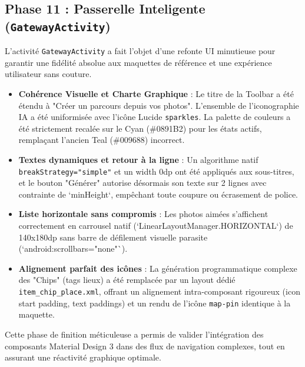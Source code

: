 \documentclass{article}
\begin{document}
\subsection{Phase 11 : Passerelle Inteligente (\texttt{GatewayActivity})}
L'activité \texttt{GatewayActivity} a fait l'objet d'une refonte UI minutieuse pour garantir une fidélité absolue aux maquettes de référence et une expérience utilisateur sans couture.
\begin{itemize}
    \item \textbf{Cohérence Visuelle et Charte Graphique} : Le titre de la Toolbar a été étendu à "Créer un parcours depuis vos photos". L'ensemble de l'iconographie IA a été uniformisée avec l'icône Lucide \texttt{sparkles}. La palette de couleurs a été strictement recalée sur le Cyan (\#0891B2) pour les états actifs, remplaçant l'ancien Teal (\#009688) incorrect.
    \item \textbf{Textes dynamiques et retour à la ligne} : Un algorithme natif \texttt{breakStrategy="simple"} et un width 0dp ont été appliqués aux sous-titres, et le bouton "Générer" autorise désormais son texte sur 2 lignes avec contrainte de `minHeight`, empêchant toute coupure ou écrasement de police.
    \item \textbf{Liste horizontale sans compromis} : Les photos aimées s'affichent correctement en carrousel natif (`LinearLayoutManager.HORIZONTAL`) de 140x180dp sans barre de défilement visuelle parasite (`android:scrollbars="none"`).
    \item \textbf{Alignement parfait des icônes} : La génération programmatique complexe des "Chips" (tags lieux) a été remplacée par un layout dédié \texttt{item\_chip\_place.xml}, offrant un alignement intra-composant rigoureux (icon start padding, text paddings) et un rendu de l'icône \texttt{map-pin} identique à la maquette.
\end{itemize}
Cette phase de finition méticuleuse a permis de valider l'intégration des composants Material Design 3 dans des flux de navigation complexes, tout en assurant une réactivité graphique optimale.
\end{document}
